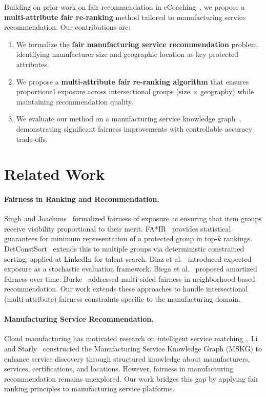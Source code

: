 \documentclass[sigconf,natbib=true]{acmart}
\begin{document}
Building on prior work on fair recommendation in eCoaching~\cite{boratto2022fair}, we propose a \textbf{multi-attribute fair re-ranking} method tailored to manufacturing service recommendation. Our contributions are:

\begin{enumerate}
    \item We formalize the \textbf{fair manufacturing service recommendation} problem, identifying manufacturer size and geographic location as key protected attributes.
    \item We propose a \textbf{multi-attribute fair re-ranking algorithm} that ensures proportional exposure across intersectional groups (size $\times$ geography) while maintaining recommendation quality.
    \item We evaluate our method on a manufacturing service knowledge graph~\cite{li2024building}, demonstrating significant fairness improvements with controllable accuracy trade-offs.
\end{enumerate}

\section{Related Work}
\label{sec:related}

\paragraph{Fairness in Ranking and Recommendation.}
Singh and Joachims~\cite{singh2018fairness} formalized fairness of exposure as ensuring that item groups receive visibility proportional to their merit. FA*IR~\cite{zehlike2017fair} provides statistical guarantees for minimum representation of a protected group in top-$k$ rankings. DetConstSort~\cite{geyik2019fairness} extends this to multiple groups via deterministic constrained sorting, applied at LinkedIn for talent search. Diaz et al.~\cite{diaz2020evaluating} introduced expected exposure as a stochastic evaluation framework. Biega et al.~\cite{biega2018equity} proposed amortized fairness over time. Burke~\cite{burke2018balanced} addressed multi-sided fairness in neighborhood-based recommendation. Our work extends these approaches to handle intersectional (multi-attribute) fairness constraints specific to the manufacturing domain.

\paragraph{Manufacturing Service Recommendation.}
Cloud manufacturing has motivated research on intelligent service matching~\cite{lu2020cloud}. Li and Starly~\cite{li2024building} constructed the Manufacturing Service Knowledge Graph (MSKG) to enhance service discovery through structured knowledge about manufacturers, services, certifications, and locations. However, fairness in manufacturing recommendation remains unexplored. Our work bridges this gap by applying fair ranking principles to manufacturing service platforms.
\end{document}
